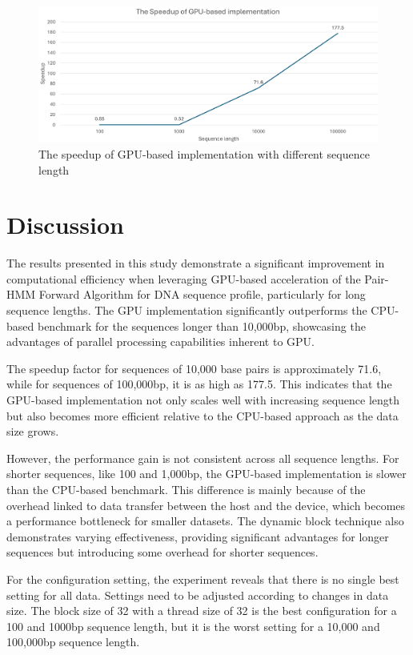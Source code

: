 \documentclass[PhD]{PHlab-thesis}
\begin{document}
\begin{figure}[h]
    \centering
    \includegraphics[width=0.9\linewidth]{figure/Speedup.png}
    \caption{The speedup of GPU-based implementation with different sequence length}
    \label{fig:speedup}
\end{figure}

\chapter{Discussion}
The results presented in this study demonstrate a significant improvement in computational efficiency when leveraging GPU-based acceleration of the Pair-HMM Forward Algorithm for DNA sequence profile, particularly for long sequence lengths. The GPU implementation significantly outperforms the CPU-based benchmark for the sequences longer than 10,000bp, showcasing the advantages of parallel processing capabilities inherent to GPU.

The speedup factor for sequences of 10,000 base pairs is approximately 71.6, while for sequences of 100,000bp, it is as high as 177.5. This indicates that the GPU-based implementation not only scales well with increasing sequence length but also becomes more efficient relative to the CPU-based approach as the data size grows.

However, the performance gain is not consistent across all sequence lengths. For shorter sequences, like 100 and 1,000bp, the GPU-based implementation is slower than the CPU-based benchmark. This difference is mainly because of the overhead linked to data transfer between the host and the device, which becomes a performance bottleneck for smaller datasets. The dynamic block technique also demonstrates varying effectiveness, providing significant advantages for longer sequences but introducing some overhead for shorter sequences.

For the configuration setting, the experiment reveals that there is no single best setting for all data. Settings need to be adjusted according to changes in data size. The block size of 32 with a thread size of 32 is the best configuration for a 100 and 1000bp sequence length, but it is the worst setting for a 10,000 and 100,000bp sequence length.
\end{document}
